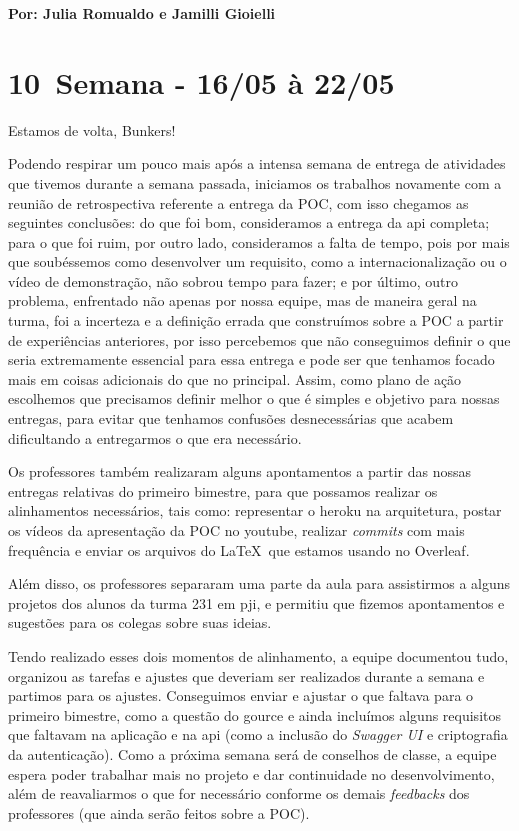 \textbf{Por: Julia Romualdo e Jamilli Gioielli}

\section{10\textordfeminine \, Semana - 16/05 à 22/05}
Estamos de volta, Bunkers!

Podendo respirar um pouco mais após a intensa semana de entrega de atividades que tivemos durante a semana passada, iniciamos os trabalhos novamente com a reunião de retrospectiva referente a entrega da \gls{POC}, com isso chegamos as seguintes conclusões: do que foi bom, consideramos a entrega da \acs{api} completa;  para o que foi ruim, por outro lado, consideramos a falta de tempo, pois por mais que soubéssemos como desenvolver um requisito, como a internacionalização ou o vídeo de demonstração, não sobrou tempo para fazer; e por último, outro problema, enfrentado não apenas por nossa equipe, mas de maneira geral na turma, foi a incerteza e a definição errada que construímos sobre a \gls{POC} a partir de experiências anteriores, por isso percebemos que não conseguimos definir o que seria extremamente essencial para essa entrega e pode ser que tenhamos focado mais em coisas adicionais do que no principal. Assim, como plano de ação escolhemos que precisamos definir melhor o que é simples e objetivo para nossas entregas, para evitar que tenhamos confusões desnecessárias que acabem dificultando a entregarmos o que era necessário.

Os professores também realizaram alguns apontamentos a partir das nossas entregas relativas do primeiro bimestre, para que possamos realizar os alinhamentos necessários, tais como: representar o \gls{heroku} na arquitetura, postar os vídeos da apresentação da \gls{POC} no \gls{youtube}, realizar \textit{commits} com mais frequência e enviar os arquivos do \LaTeX \, que estamos usando no Overleaf.

Além disso, os professores separaram uma parte da aula para assistirmos a alguns projetos dos alunos da turma 231 em \acs{pji}, e permitiu que fizemos apontamentos e sugestões para os colegas sobre suas ideias.

Tendo realizado esses dois momentos de alinhamento, a equipe documentou tudo, organizou as tarefas e ajustes que deveriam ser realizados durante a semana e partimos para os ajustes. Conseguimos enviar e ajustar o que faltava para o primeiro bimestre, como a questão do \gls{gource} e ainda incluímos alguns requisitos que faltavam na aplicação e na \gls{api} (como a inclusão do \textit{Swagger UI} e criptografia da autenticação). Como a próxima semana será de conselhos de classe, a equipe espera poder trabalhar mais no projeto e dar continuidade no desenvolvimento, além de reavaliarmos o que for necessário conforme os demais \textit{feedbacks} dos professores (que ainda serão feitos sobre a \acs{POC}).

